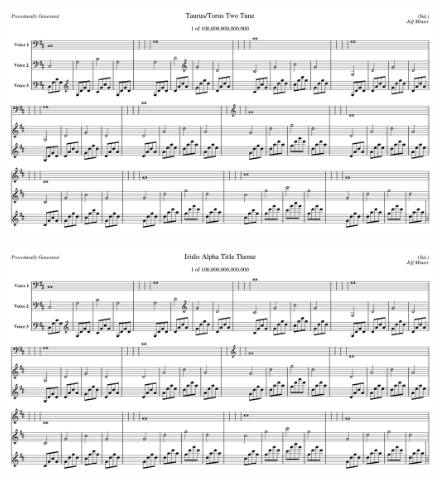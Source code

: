 \lstset{style=6502Style}



\begin{figure}[H]
{
  \begin{adjustbox}{width=14cm,center}
    \includegraphics[width=14cm]{torus/torus2_title_no_1_page_1001.png}%
  \end{adjustbox}
}\caption[]{}
\end{figure}

\begin{figure}[H]
{
  \begin{adjustbox}{width=14cm,center}
    \includegraphics[width=14cm]{music/title_no_1_page_1001.png}%
  \end{adjustbox}
}\caption[]{}
\end{figure}

